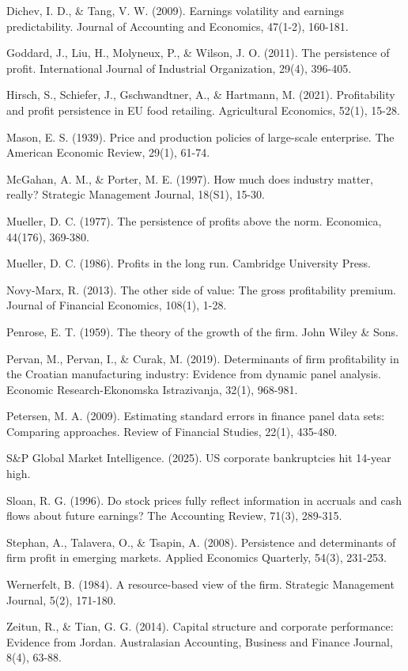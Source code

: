 \documentclass[12pt,a4paper]{report}
\begin{document}
Dichev, I. D., \& Tang, V. W. (2009). Earnings volatility and earnings
predictability. Journal of Accounting and Economics, 47(1-2), 160-181.

Goddard, J., Liu, H., Molyneux, P., \& Wilson, J. O. (2011). The
persistence of profit. International Journal of Industrial Organization,
29(4), 396-405.

Hirsch, S., Schiefer, J., Gschwandtner, A., \& Hartmann, M. (2021).
Profitability and profit persistence in EU food retailing. Agricultural
Economics, 52(1), 15-28.

Mason, E. S. (1939). Price and production policies of large-scale
enterprise. The American Economic Review, 29(1), 61-74.

McGahan, A. M., \& Porter, M. E. (1997). How much does industry matter,
really? Strategic Management Journal, 18(S1), 15-30.

Mueller, D. C. (1977). The persistence of profits above the norm.
Economica, 44(176), 369-380.

Mueller, D. C. (1986). Profits in the long run. Cambridge University
Press.

Novy-Marx, R. (2013). The other side of value: The gross profitability
premium. Journal of Financial Economics, 108(1), 1-28.

Penrose, E. T. (1959). The theory of the growth of the firm. John Wiley
\& Sons.

Pervan, M., Pervan, I., \& Curak, M. (2019). Determinants of firm
profitability in the Croatian manufacturing industry: Evidence from
dynamic panel analysis. Economic Research-Ekonomska Istrazivanja, 32(1),
968-981.

Petersen, M. A. (2009). Estimating standard errors in finance panel data
sets: Comparing approaches. Review of Financial Studies, 22(1), 435-480.

S\&P Global Market Intelligence. (2025). US corporate bankruptcies hit
14-year high.

Sloan, R. G. (1996). Do stock prices fully reflect information in
accruals and cash flows about future earnings? The Accounting Review,
71(3), 289-315.

Stephan, A., Talavera, O., \& Tsapin, A. (2008). Persistence and
determinants of firm profit in emerging markets. Applied Economics
Quarterly, 54(3), 231-253.

Wernerfelt, B. (1984). A resource-based view of the firm. Strategic
Management Journal, 5(2), 171-180.

Zeitun, R., \& Tian, G. G. (2014). Capital structure and corporate
performance: Evidence from Jordan. Australasian Accounting, Business and
Finance Journal, 8(4), 63-88.
\end{document}
